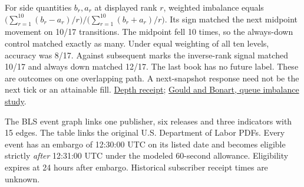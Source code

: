 \documentclass[11pt,letterpaper]{article}
\newcommand{\heading}[1]{\vspace{.34em}{\Large\bfseries #1}\par}
\newcommand{\site}{https://amelie-iska.github.io/phaseweave-lab}
\begin{document}
For side quantities $b_r,a_r$ at displayed rank $r$, weighted imbalance equals
$\bigl(\sum_{r=1}^{10}(b_r-a_r)/r\bigr)/\bigl(\sum_{r=1}^{10}(b_r+a_r)/r\bigr)$. Its sign matched the next midpoint movement on 10/17 transitions. The midpoint fell 10 times, so the always-down control matched exactly as many. Under equal weighting of all ten levels, accuracy was 8/17. Against subsequent marks the inverse-rank signal matched 10/17 and always down matched 12/17. The last book has no future label. These are outcomes on one overlapping path. A next-snapshot response need not be the next tick or an attainable fill. \href{\site/liquidity-response-v1.json}{Depth receipt}; \href{https://arxiv.org/abs/1512.03492}{Gould and Bonart, queue imbalance study}.

\heading{5. Original-vintage macro releases at decision time}
The BLS event graph links one publisher, six releases and three indicators with 15 edges. The table links the original U.S. Department of Labor PDFs. Every event has an embargo of 12:30:00 UTC on its listed date and becomes eligible strictly \emph{after} 12:31:00 UTC under the modeled 60-second allowance. Eligibility expires at 24 hours after embargo. Historical subscriber receipt times are unknown.
\end{document}
